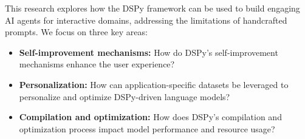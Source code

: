 This research explores how the DSPy framework can be used to build engaging AI agents for interactive domains, addressing the limitations of handcrafted prompts. We focus on three key areas:\\
\begin{itemize}
\item \textbf{Self-improvement mechanisms:} How do DSPy's self-improvement mechanisms enhance the user experience?

\item \textbf{Personalization:} How can application-specific datasets be leveraged to personalize and optimize DSPy-driven language models?

\item \textbf{Compilation and optimization:} How does DSPy's compilation and optimization process impact model performance and resource usage?
\end{itemize}

